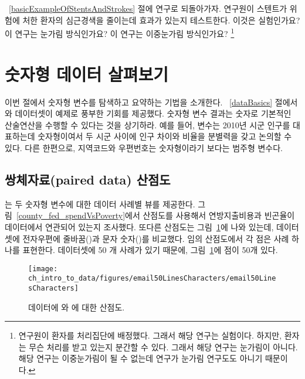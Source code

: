 \begin{exercise}
~\ref{basicExampleOfStentsAndStrokes} 절에 연구로 되돌아가자. 연구원이 스텐트가 위험에 처한 환자의 심근경색을 줄이는데 효과가 있는지 테스트한다. 이것은 실험인가요? 이 연구는 눈가림 방식인가요?  이 연구는 이중눈가림 방식인가요?
\footnote{연구원이 환자를 처리집단에 배정했다. 그래서 해당 연구는 실험이다.
하지만, 환자는 무슨 처리를 받고 있는지 분간할 수 있다. 그래서 해당 연구는 눈가림이 아니다. 해당 연구는 이중눈가림이 될 수 없는데 연구가 눈가림 연구도도 아니기 때문이다.}
\end{exercise}


\section[Examining numerical data]{숫자형 데이터 살펴보기 }
\label{numericalData}

이번 절에서 숫자형 변수를 탐색하고 요약하는 기법을 소개한다.
~\ref{dataBasics} 절에서 와  데이터셋이 예제로 풍부한 기회를 제공했다.
숫자형 변수 결과는 숫자로 기본적인 산술연산을 수행할 수 있다는 것을 상기하라.
예를 들어,  변수는 2010년 시군 인구를 대표하는데 숫자형이여서
두 시군 사이에 인구 차이와 비율을 분별력을 갖고 논의할 수 있다.
다른 한편으로, 지역코드와 우편번호는 숫자형이라기 보다는 범주형 변수다.


\subsection{쌍체자료(paired data) 산점도}
\label{scatterPlots}


는 두 숫자형 변수에 대한 데이터 사례별 뷰를 제공한다.
그림~\vref{county_fed_spendVsPoverty}에서 산점도를 사용해서 연방지출비용과 빈곤율이  데이터에서 연관되어 있는지 조사했다. 또다른 산점도는 그림~\ref{email50LinesCharacters}에 나와 있는데,  데이터셋에 전자우편에 줄바꿈()과 문자 숫자()를 비교했다.
임의 산점도에서 각 점은 사례 하나를 표현한다.  데이터셋에 50 개 사례가 있기 때문에, 
그림~\ref{email50LinesCharacters}에 점이 50개 있다.

\textC{\setlength{\captionwidth}{0.9\textwidth}}

\begin{figure}[h]
   \centering
   \texttt{[image: ch\_intro\_to\_data/figures/email50LinesCharacters/email50LinesCharacters]}
   \caption{ 데이터에  와 에 대한 산점도.}
   \label{email50LinesCharacters}
\end{figure}

